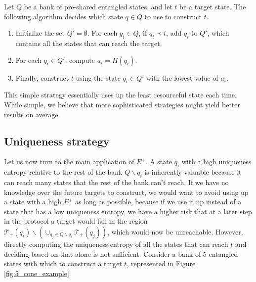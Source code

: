 \begin{definition} \label{strat:individual}
    Let $Q$ be a bank of pre-shared entangled states, and let $t$ be a target state. The following algorithm decides which state $q \in Q$ to use to construct $t$.
    \begin{enumerate}
        \item Initialize the set $Q' = \emptyset$. For each $q_i \in Q$, if $q_i \prec t$, add $q_i$ to $Q'$, which contains all the states that can reach the target.
        \item For each $q_i \in Q'$, compute $a_i = H(q_i)$.
        \item Finally, construct $t$ using the state $q_i \in Q'$ with the lowest value of $a_i$.
    \end{enumerate}
\end{definition}

This simple strategy essentially uses up the least resourceful state each time. While simple, we believe that more sophisticated strategies might yield better results on average.



\subsection{Uniqueness strategy}

Let us now turn to the main application of $E^+$. A state $q_i$ with a high uniqueness entropy relative to the rest of the bank $Q \backslash q_i$ is inherently valuable because it can reach many states that the rest of the bank can't reach. If we have no knowledge over the future targets to construct, we would want to avoid using up a state with a high $E^+$ as long as possible, because if we use it up instead of a state that has a low uniqueness entropy, we have a higher risk that at a later step in the protocol a target would fall in the region
$\mathcal{T}_+(q_i) \backslash \left(\cup_{q_j \in Q \backslash q_i} \mathcal{T}_+(q_j)\right)$, which would now be unreachable. However, directly computing the uniqueness entropy of all the states that can reach $t$ and deciding based on that alone is not sufficient. Consider a bank of 5 entangled states with which to construct a target $t$, represented in Figure \ref{fig:5_cone_example}.

